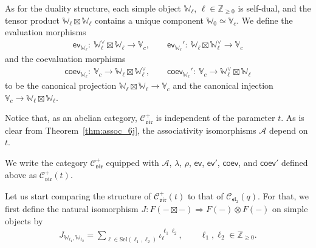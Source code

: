 \documentclass[pdftex]{sigma}
\numberwithin{equation}{section}
\newcommand{\bZ}{\mathbb{Z}}
\newcommand{\cA}{\mathcal{A}}
\newcommand{\cC}{\mathcal{C}}
\newcommand{\fsl}{\mathfrak{sl}}
\newcommand{\CGemb}[3]{\iota_{#1}^{#2 #3}}
\newcommand{\catQG}{\cC_{\fsl_{2}}}
\newcommand{\catVir}{\cC_{\vir}}
\newcommand{\Sel}{\mathrm{Sel}}
\newcommand{\virvoa}{\mathbb{V}}
\newcommand{\virmod}{\mathbb{W}}
\newcommand{\vir}{\mathfrak{vir}}
\newcommand{\ev}{\mathsf{ev}}
\newcommand{\coev}{\mathsf{coev}}
\begin{document}
As for the duality structure, each simple object $\virmod_{\ell}$, $\ell\in \bZ_{\geq 0}$ is self-dual, and the tensor product $\virmod_{\ell}\boxtimes\virmod_{\ell}$ contains a unique component $\virmod_{0}\simeq \virvoa_{c}$.
We define the evaluation morphisms
\begin{align*}
	\ev_{\virmod_{\ell}}\colon\ \virmod_{\ell}^{\vee}\boxtimes \virmod_{\ell} \to \virvoa_{c},\qquad
	\ev_{\virmod_{\ell}}'\colon\ \virmod_{\ell}\boxtimes \virmod_{\ell}^{\vee} \to \virvoa_{c}
\end{align*}
and the coevaluation morphisms
\begin{align*}
	\coev_{\virmod_{\ell}}\colon\ \virvoa_{c} \to \virmod_{\ell}\boxtimes \virmod_{\ell}^{\vee},\qquad
	\coev_{\virmod_{\ell}}'\colon\ \virvoa_{c} \to \virmod_{\ell}^{\vee}\boxtimes \virmod_{\ell}
\end{align*}to be the canonical projection
$\virmod_{\ell}\boxtimes\virmod_{\ell} \to \virvoa_{c}$ and the canonical injection
$\virvoa_{c} \to \virmod_{\ell}\boxtimes\virmod_{\ell}$.

Notice that, as an abelian category, $\catVir^{+}$ is independent of the parameter $t$.
As is clear from Theorem~\ref{thm:assoc_6j}, the associativity isomorphisms $\cA$ depend on $t$.

\begin{defn}
We write the category $\catVir^{+}$ equipped with $\cA$, $\lambda$, $\rho$,
$\ev$, $\ev'$, $\coev$, and $\coev'$ defined above as $\catVir^{+}(t)$.
\end{defn}

Let us start comparing the structure of $\catVir^{+}(t)$ to that of $\catQG(q)$.
For that, we first define the natural isomorphism
$
	J \colon F(- \boxtimes -) \Rightarrow F(-)\otimes F(-)
$
on simple objects by
\begin{gather*}
	J_{\virmod_{\ell_{1}},\virmod_{\ell_{2}}} = \sum_{\ell\in \Sel (\ell_{1},\ell_{2})}\CGemb{\ell}{\ell_{1}}{\ell_{2}},\qquad \ell_{1},\ell_{2}\in \bZ_{\geq 0}.
\end{gather*}
\end{document}
